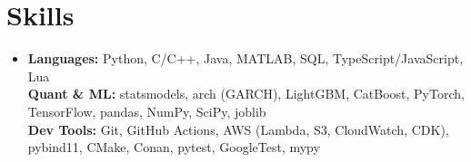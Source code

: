 \documentclass[letterpaper,11pt]{article}
\begin{document}
\section{Skills}
  \begin{itemize}[leftmargin=0pt,labelsep=0pt,label={},topsep=2pt]
    \small\item{
      \textbf{Languages:} Python, C/C++, Java, MATLAB, SQL, TypeScript/JavaScript, Lua \\
      \textbf{Quant \& ML:} statsmodels, arch (GARCH), LightGBM, CatBoost, PyTorch, TensorFlow, pandas, NumPy, SciPy, joblib \\
      \textbf{Dev Tools:} Git, GitHub Actions, AWS (Lambda, S3, CloudWatch, CDK), pybind11, CMake, Conan, pytest, GoogleTest, mypy
    }
  \end{itemize}
\end{document}
